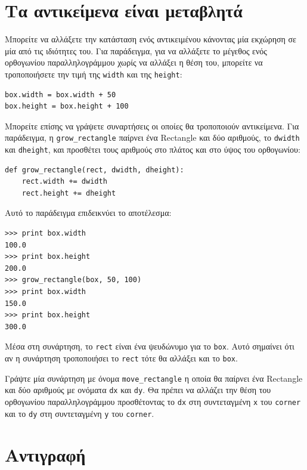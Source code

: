 \documentclass[10pt]{book}
\begin{document}
 
\section{Τα αντικείμενα είναι μεταβλητά}

Μπορείτε να αλλάξετε την κατάσταση ενός αντικειμένου κάνοντας μία εκχώρηση σε μία από τις ιδιότητες του. 
Για παράδειγμα, για να αλλάξετε το μέγεθος ενός ορθογωνίου παραλληλογράμμου χωρίς να αλλάξει η θέση του,
μπορείτε να τροποποιήσετε την τιμή της {\tt width} και της {\tt height}:

\begin{verbatim}
box.width = box.width + 50
box.height = box.height + 100
\end{verbatim}
%
Μπορείτε επίσης να γράψετε συναρτήσεις οι οποίες θα τροποποιούν αντικείμενα. Για παράδειγμα, η
\verb"grow_rectangle" παίρνει ένα Rectangle και δύο αριθμούς, το {\tt dwidth} και {\tt dheight},
και προσθέτει τους αριθμούς στο πλάτος και στο ύψος του ορθογωνίου:

\begin{verbatim}
def grow_rectangle(rect, dwidth, dheight):
    rect.width += dwidth
    rect.height += dheight
\end{verbatim}
%
Αυτό το παράδειγμα επιδεικνύει το αποτέλεσμα:

\begin{verbatim}
>>> print box.width
100.0
>>> print box.height
200.0
>>> grow_rectangle(box, 50, 100)
>>> print box.width
150.0
>>> print box.height
300.0
\end{verbatim}
%
Μέσα στη συνάρτηση, το {\tt rect} είναι ένα ψευδώνυμο για το {\tt box}. Αυτό σημαίνει ότι
αν η συνάρτηση τροποποιήσει το {\tt rect} τότε θα αλλάξει και το {\tt box}.
\\
\begin{exercise}

Γράψτε μία συνάρτηση με όνομα \verb"move_rectangle" η οποία θα παίρνει ένα Rectangle και δύο αριθμούς
με ονόματα {\tt dx} και {\tt dy}. Θα πρέπει να αλλάζει την θέση του ορθογωνίου παραλληλογράμμου
προσθέτοντας το {\tt dx} στη συντεταγμένη {\tt x} του {\tt corner} και το {\tt dy} στη συντεταγμένη
{\tt y} του {\tt corner}. 
\end{exercise}



\section{Αντιγραφή}
\label{copying}
\end{document}
